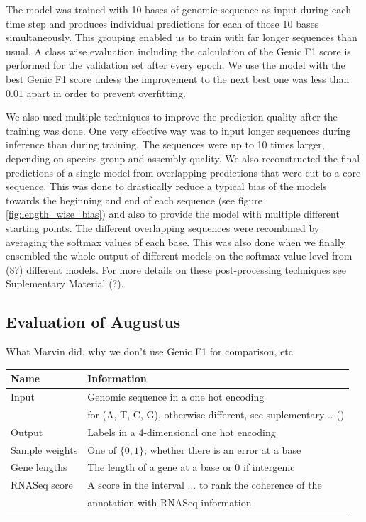\documentclass{bioinfo}
\begin{document}
\begin{methods}
The model was trained with 10 bases of genomic sequence as input during each time step and produces individual predictions for each of those 10 bases simultaneously. This grouping enabled us to train with far longer sequences than usual. A class wise evaluation including the calculation of the Genic F1 score is performed for the validation set after every epoch. We use the model with the best Genic F1 score unless the improvement to the next best one was less than $0.01$ apart in order to prevent overfitting. 

	We also used multiple techniques to improve the prediction quality after the training was done. One very effective way was to input longer sequences during inference than during training. The sequences were up to 10 times larger, depending on species group and assembly quality. We also reconstructed the final predictions of a single model from overlapping predictions that were cut to a core sequence. This was done to drastically reduce a typical bias of the models towards the beginning and end of each sequence (see figure \ref{fig:length_wise_bias}) and also to provide the model with multiple different starting points. The different overlapping sequences were recombined by averaging the softmax values of each base. This was also done when we finally ensembled the whole output of different models on the softmax value level from (8?) different models. For more details on these post-processing techniques see Suplementary Material (?). 

\subsection{Evaluation of Augustus} \label{augustus}
What Marvin did, why we don't use Genic F1 for comparison, etc


\begin{table}[!t]
 {
\begin{tabular}{@{}ll@{}}
\toprule Name & Information \\
\midrule
Input & Genomic sequence in a one hot encoding\\
	  & for (A, T, C, G), otherwise different, see suplementary .. ()\\
Output & Labels in a 4-dimensional one hot encoding \\
Sample weights & One of $\{0,1\}$; whether there is an error at a base\\
Gene lengths & The length of a gene at a base or 0 if intergenic \\
RNASeq score & A score in the interval $...$ to rank the coherence of the \\
		     & annotation with RNASeq information \\
\botrule
\end{tabular}}{}
\end{table}


\end{methods}
\end{document}
